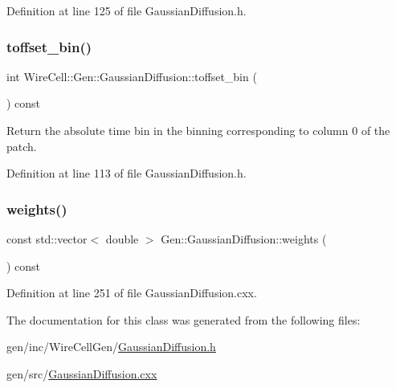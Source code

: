 Definition at line 125 of file Gaussian\+Diffusion.\+h.

\mbox{\label{class_wire_cell_1_1_gen_1_1_gaussian_diffusion_a665f92ab11b075189936553e8cf5e681}} 
\subsubsection{\texorpdfstring{toffset\+\_\+bin()}{toffset\_bin()}}
{\footnotesize\ttfamily int Wire\+Cell\+::\+Gen\+::\+Gaussian\+Diffusion\+::toffset\+\_\+bin (\begin{DoxyParamCaption}{ }\end{DoxyParamCaption}) const\hspace{0.3cm}{\ttfamily [inline]}}



Return the absolute time bin in the binning corresponding to column 0 of the patch. 



Definition at line 113 of file Gaussian\+Diffusion.\+h.

\mbox{\label{class_wire_cell_1_1_gen_1_1_gaussian_diffusion_ac69c89a9e8b3947efcd56de6055dfb47}} 
\subsubsection{\texorpdfstring{weights()}{weights()}}
{\footnotesize\ttfamily const std\+::vector$<$ double $>$ Gen\+::\+Gaussian\+Diffusion\+::weights (\begin{DoxyParamCaption}{ }\end{DoxyParamCaption}) const}



Definition at line 251 of file Gaussian\+Diffusion.\+cxx.



The documentation for this class was generated from the following files\+:\begin{DoxyCompactItemize}
\item 
gen/inc/\+Wire\+Cell\+Gen/\hyperlink{_gaussian_diffusion_8h}{Gaussian\+Diffusion.\+h}\item 
gen/src/\hyperlink{_gaussian_diffusion_8cxx}{Gaussian\+Diffusion.\+cxx}\end{DoxyCompactItemize}
